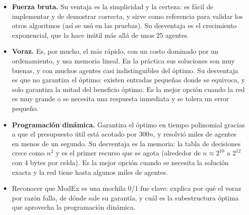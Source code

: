 \documentclass[11pt,letterpaper]{article}
\begin{document}
\begin{itemize}
  \item \textbf{Fuerza bruta.} Su ventaja es la simplicidad y la certeza: es
        fácil de implementar y de demostrar correcta, y sirve como referencia
        para validar los otros algoritmos (así se usó en las pruebas). Su
        desventaja es el crecimiento exponencial, que la hace inútil más allá
        de unos 25 agentes.
  \item \textbf{Voraz.} Es, por mucho, el más rápido, con un costo dominado
        por un ordenamiento, y usa memoria lineal. En la práctica sus
        soluciones son muy buenas, y con muchos agentes casi indistinguibles
        del óptimo. Su desventaja es que no garantiza el óptimo: existen
        entradas pequeñas donde se equivoca, y solo garantiza la mitad del
        beneficio óptimo. Es la mejor opción cuando la red es muy grande o
        se necesita una respuesta inmediata y se tolera un error pequeño.
  \item \textbf{Programación dinámica.} Garantiza el óptimo en tiempo
        polinomial gracias a que el presupuesto útil está acotado por $300n$,
        y resolvió miles de agentes en menos de un segundo. Su desventaja es
        la memoria: la tabla de decisiones crece como $n^2$ y es el primer
        recurso que se agota (alrededor de $n \approx 2^{10}$ a $2^{12}$ con
        4 bytes por celda). Es la mejor opción cuando se necesita la solución
        exacta y la red tiene hasta algunos miles de agentes.
  \item Reconocer que ModEx es una mochila 0/1 fue clave: explica por qué el
        voraz por razón falla, de dónde sale su garantía, y cuál es la
        subestructura óptima que aprovecha la programación dinámica.
\end{itemize}
\end{document}
